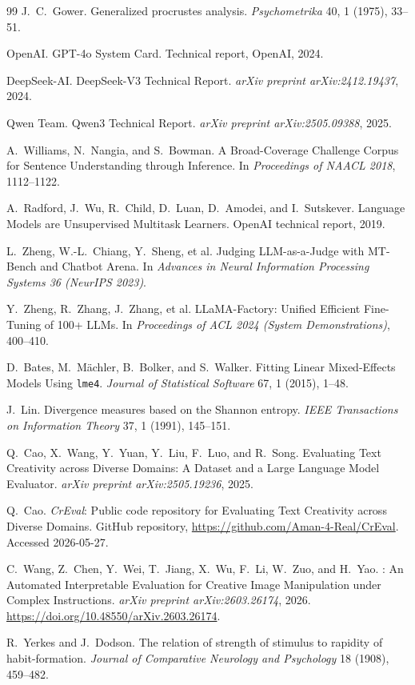 \documentclass[sigconf,nonacm]{acmart}
\begin{document}
\begin{thebibliography}{99}
J.~C.~Gower.
\newblock Generalized procrustes analysis.
\newblock \textit{Psychometrika} 40, 1 (1975), 33--51.

OpenAI.
\newblock GPT-4o System Card.
\newblock Technical report, OpenAI, 2024.

DeepSeek-AI.
\newblock DeepSeek-V3 Technical Report.
\newblock \textit{arXiv preprint arXiv:2412.19437}, 2024.

Qwen Team.
\newblock Qwen3 Technical Report.
\newblock \textit{arXiv preprint arXiv:2505.09388}, 2025.

A.~Williams, N.~Nangia, and S.~Bowman.
\newblock A Broad-Coverage Challenge Corpus for Sentence Understanding through Inference.
\newblock In \textit{Proceedings of NAACL 2018}, 1112--1122.

A.~Radford, J.~Wu, R.~Child, D.~Luan, D.~Amodei, and I.~Sutskever.
\newblock Language Models are Unsupervised Multitask Learners.
\newblock OpenAI technical report, 2019.

L.~Zheng, W.-L.~Chiang, Y.~Sheng, et al.
\newblock Judging LLM-as-a-Judge with MT-Bench and Chatbot Arena.
\newblock In \textit{Advances in Neural Information Processing Systems 36 (NeurIPS 2023)}.

Y.~Zheng, R.~Zhang, J.~Zhang, et al.
\newblock LLaMA-Factory: Unified Efficient Fine-Tuning of 100+ LLMs.
\newblock In \textit{Proceedings of ACL 2024 (System Demonstrations)}, 400--410.

D.~Bates, M.~M\"achler, B.~Bolker, and S.~Walker.
\newblock Fitting Linear Mixed-Effects Models Using \texttt{lme4}.
\newblock \textit{Journal of Statistical Software} 67, 1 (2015), 1--48.

J.~Lin.
\newblock Divergence measures based on the Shannon entropy.
\newblock \textit{IEEE Transactions on Information Theory} 37, 1 (1991), 145--151.

Q.~Cao, X.~Wang, Y.~Yuan, Y.~Liu, F.~Luo, and R.~Song.
\newblock Evaluating Text Creativity across Diverse Domains: A Dataset and a Large Language Model Evaluator.
\newblock \textit{arXiv preprint arXiv:2505.19236}, 2025.

Q.~Cao.
\newblock \textit{CrEval}: Public code repository for Evaluating Text Creativity across Diverse Domains.
\newblock GitHub repository, \url{https://github.com/Aman-4-Real/CrEval}. Accessed 2026-05-27.

C.~Wang, Z.~Chen, Y.~Wei, T.~Jiang, X.~Wu, F.~Li, W.~Zuo, and H.~Yao.
: An Automated Interpretable Evaluation for Creative Image Manipulation under Complex Instructions.
\newblock \textit{arXiv preprint arXiv:2603.26174}, 2026. \url{https://doi.org/10.48550/arXiv.2603.26174}.

R.~Yerkes and J.~Dodson.
\newblock The relation of strength of stimulus to rapidity of habit-formation.
\newblock \textit{Journal of Comparative Neurology and Psychology} 18 (1908), 459--482.

\end{thebibliography}
\end{document}
